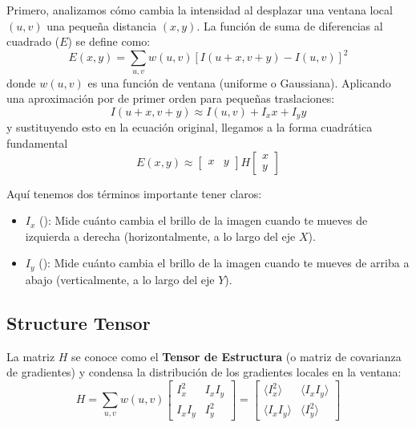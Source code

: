 \noindent
Primero, analizamos cómo cambia la intensidad al desplazar una ventana local $(u,v)$ una pequeña distancia $(x,y)$. La función de suma de diferencias al cuadrado ($E$) se define como:
$$E(x,y) = \sum_{u,v} w(u,v) \left[ I(u+x, v+y) - I(u,v) \right]^2$$
donde $w(u,v)$ es una función de ventana (uniforme o Gaussiana). Aplicando una aproximación por  de primer orden para pequeñas traslaciones:
$$I(u+x, v+y) \approx I(u,v) + I_x x + I_y y$$
y sustituyendo esto en la ecuación original, llegamos a la forma cuadrática fundamental
$$E(x,y) \approx \begin{bmatrix} x & y \end{bmatrix} H\begin{bmatrix} x \\ y \end{bmatrix}$$

\begin{notacion}
    Aquí tenemos dos términos importante tener claros:
    \begin{itemize}
        \item $I_x$ (): Mide cuánto cambia el brillo de la imagen cuando te mueves de izquierda a derecha (horizontalmente, a lo largo del eje $X$).
        \item $I_y$ (): Mide cuánto cambia el brillo de la imagen cuando te mueves de arriba a abajo (verticalmente, a lo largo del eje $Y$).
    \end{itemize}
\end{notacion}

\subsection{Structure Tensor}
\begin{definicion}
    La matriz $H$ se conoce como el \textbf{Tensor de Estructura} (o matriz de covarianza de gradientes) y condensa la distribución de los gradientes locales en la ventana:
    $$H = \sum_{u,v} w(u,v) \begin{bmatrix} I_x^2 & I_x I_y \\ I_x I_y & I_y^2 \end{bmatrix} = \begin{bmatrix} \langle I_x^2 \rangle & \langle I_x I_y \rangle \\ \langle I_x I_y \rangle & \langle I_y^2 \rangle \end{bmatrix}$$
\end{definicion}


